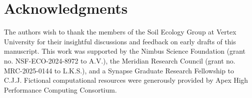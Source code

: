 \section*{Acknowledgments}

The authors wish to thank the members of the Soil Ecology Group at Vertex University for their insightful discussions and feedback on early drafts of this manuscript. This work was supported by the Nimbus Science Foundation (grant no. NSF-ECO-2024-8972 to A.V.), the Meridian Research Council (grant no. MRC-2025-0144 to L.K.S.), and a Synapse Graduate Research Fellowship to C.J.J. Fictional computational resources were generously provided by Apex High Performance Computing Consortium.
